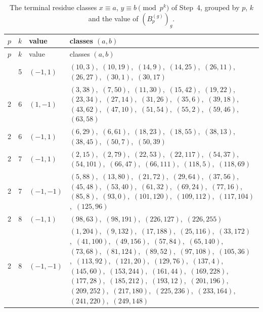 \documentclass[11pt]{article}
\begin{document}
\begingroup\small
\setlength{\LTcapwidth}{\textwidth}
\begin{longtable}{@{}rrl>{\raggedright\arraybackslash}p{}@{}}
\caption{The terminal residue classes $x\equiv a$, $y\equiv b\pmod{p^k}$ of Step~4, grouped by $p$, $k$ and the value of $(B^{(g)}_p)_g$.}\label{tab:local}\\
\hline $p$ & $k$ & value & classes $(a,b)$\\\hline\endfirsthead
\hline $p$ & $k$ & value & classes $(a,b)$\\\hline\endhead\hline\endfoot
2 & 5 & $(-1,1)$ & $(10,3)$,\allowbreak\ $(10,19)$,\allowbreak\ $(14,9)$,\allowbreak\ $(14,25)$,\allowbreak\ $(26,11)$,\allowbreak\ $(26,27)$,\allowbreak\ $(30,1)$,\allowbreak\ $(30,17)$\\
2 & 6 & $(1,-1)$ & $(3,38)$,\allowbreak\ $(7,50)$,\allowbreak\ $(11,30)$,\allowbreak\ $(15,42)$,\allowbreak\ $(19,22)$,\allowbreak\ $(23,34)$,\allowbreak\ $(27,14)$,\allowbreak\ $(31,26)$,\allowbreak\ $(35,6)$,\allowbreak\ $(39,18)$,\allowbreak\ $(43,62)$,\allowbreak\ $(47,10)$,\allowbreak\ $(51,54)$,\allowbreak\ $(55,2)$,\allowbreak\ $(59,46)$,\allowbreak\ $(63,58)$\\
2 & 6 & $(-1,1)$ & $(6,29)$,\allowbreak\ $(6,61)$,\allowbreak\ $(18,23)$,\allowbreak\ $(18,55)$,\allowbreak\ $(38,13)$,\allowbreak\ $(38,45)$,\allowbreak\ $(50,7)$,\allowbreak\ $(50,39)$\\
2 & 7 & $(-1,1)$ & $(2,15)$,\allowbreak\ $(2,79)$,\allowbreak\ $(22,53)$,\allowbreak\ $(22,117)$,\allowbreak\ $(54,37)$,\allowbreak\ $(54,101)$,\allowbreak\ $(66,47)$,\allowbreak\ $(66,111)$,\allowbreak\ $(118,5)$,\allowbreak\ $(118,69)$\\
2 & 7 & $(-1,-1)$ & $(5,88)$,\allowbreak\ $(13,80)$,\allowbreak\ $(21,72)$,\allowbreak\ $(29,64)$,\allowbreak\ $(37,56)$,\allowbreak\ $(45,48)$,\allowbreak\ $(53,40)$,\allowbreak\ $(61,32)$,\allowbreak\ $(69,24)$,\allowbreak\ $(77,16)$,\allowbreak\ $(85,8)$,\allowbreak\ $(93,0)$,\allowbreak\ $(101,120)$,\allowbreak\ $(109,112)$,\allowbreak\ $(117,104)$,\allowbreak\ $(125,96)$\\
2 & 8 & $(-1,1)$ & $(98,63)$,\allowbreak\ $(98,191)$,\allowbreak\ $(226,127)$,\allowbreak\ $(226,255)$\\
2 & 8 & $(-1,-1)$ & $(1,204)$,\allowbreak\ $(9,132)$,\allowbreak\ $(17,188)$,\allowbreak\ $(25,116)$,\allowbreak\ $(33,172)$,\allowbreak\ $(41,100)$,\allowbreak\ $(49,156)$,\allowbreak\ $(57,84)$,\allowbreak\ $(65,140)$,\allowbreak\ $(73,68)$,\allowbreak\ $(81,124)$,\allowbreak\ $(89,52)$,\allowbreak\ $(97,108)$,\allowbreak\ $(105,36)$,\allowbreak\ $(113,92)$,\allowbreak\ $(121,20)$,\allowbreak\ $(129,76)$,\allowbreak\ $(137,4)$,\allowbreak\ $(145,60)$,\allowbreak\ $(153,244)$,\allowbreak\ $(161,44)$,\allowbreak\ $(169,228)$,\allowbreak\ $(177,28)$,\allowbreak\ $(185,212)$,\allowbreak\ $(193,12)$,\allowbreak\ $(201,196)$,\allowbreak\ $(209,252)$,\allowbreak\ $(217,180)$,\allowbreak\ $(225,236)$,\allowbreak\ $(233,164)$,\allowbreak\ $(241,220)$,\allowbreak\ $(249,148)$\\

\end{longtable}
\end{document}
